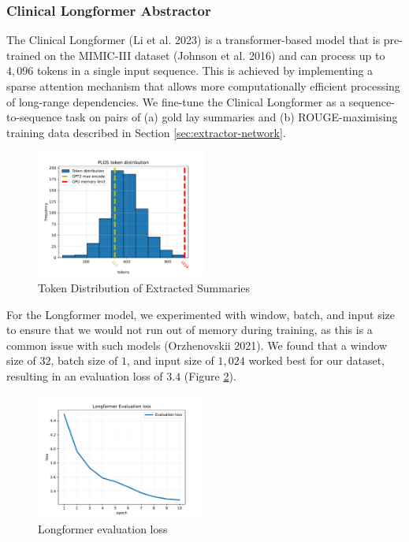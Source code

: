 \documentclass[
]{article}
\begin{document}
\hypertarget{sec:clinical-longformer-abstractor}{%
\subsubsection{Clinical Longformer
Abstractor}\label{sec:clinical-longformer-abstractor}}

The Clinical Longformer (Li et al. 2023) is a transformer-based model
that is pre-trained on the MIMIC-III dataset (Johnson et al. 2016) and
can process up to \(4,096\) tokens in a single input sequence. This is
achieved by implementing a sparse attention mechanism that allows more
computationally efficient processing of long-range dependencies. We
fine-tune the Clinical Longformer as a sequence-to-sequence task on
pairs of (a) gold lay summaries and (b) ROUGE-maximising training data
described in Section \ref{sec:extractor-network}.

\begin{figure}
    \centering
    \includegraphics[width=0.5\textwidth]{charts/token_distribution}
    \caption{Token Distribution of Extracted Summaries}\label{fig:abstractor-eval-rouge}
\end{figure}

For the Longformer model, we experimented with window, batch, and input
size to ensure that we would not run out of memory during training, as
this is a common issue with such models (Orzhenovskii 2021). We found
that a window size of \(32\), batch size of \(1\), and input size of
\(1,024\) worked best for our dataset, resulting in an evaluation loss
of \(3.4\) (Figure \ref{fig:abstractor-eval-loss}).

\begin{figure}
    \centering
    \includegraphics[width=0.49\textwidth]{charts/lf_eval_loss}
    \caption{Longformer evaluation loss}\label{fig:abstractor-eval-loss}
\end{figure}
\end{document}
